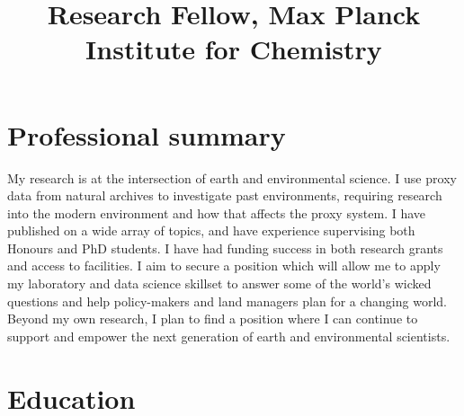 \documentclass[11pt,a4paper,]{moderncv}
\title{Research Fellow, Max Planck Institute for Chemistry}
\begin{document}
\makecvtitle



\hypertarget{professional-summary}{%
\section{Professional summary}\label{professional-summary}}

My research is at the intersection of earth and environmental science. I
use proxy data from natural archives to investigate past environments,
requiring research into the modern environment and how that affects the
proxy system. I have published on a wide array of topics, and have
experience supervising both Honours and PhD students. I have had funding
success in both research grants and access to facilities. I aim to
secure a position which will allow me to apply my laboratory and data
science skillset to answer some of the world's wicked questions and help
policy-makers and land managers plan for a changing world. Beyond my own
research, I plan to find a position where I can continue to support and
empower the next generation of earth and environmental scientists.

\hypertarget{education}{%
\section{Education}\label{education}}

\nopagebreak
    \nopagebreak
\end{document}
